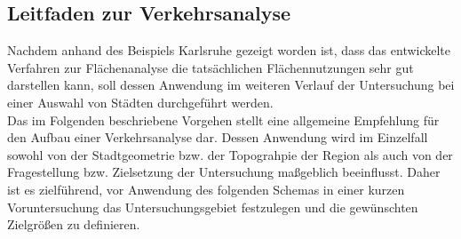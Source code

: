 \subsection{Leitfaden zur Verkehrsanalyse}
Nachdem anhand des Beispiels Karlsruhe gezeigt worden ist, dass das entwickelte Verfahren zur Flächenanalyse die tatsächlichen Flächennutzungen sehr gut darstellen kann, soll dessen Anwendung im weiteren Verlauf der Untersuchung bei einer Auswahl von Städten durchgeführt werden.\\

Das im Folgenden beschriebene Vorgehen stellt eine allgemeine Empfehlung für den Aufbau einer Verkehrsanalyse dar. Dessen Anwendung wird im Einzelfall sowohl von der Stadtgeometrie bzw. der Topograhpie der Region als auch von der Fragestellung bzw. Zielsetzung der Untersuchung maßgeblich beeinflusst. Daher ist es zielführend, vor Anwendung des folgenden Schemas in einer kurzen Voruntersuchung das Untersuchungsgebiet festzulegen und die gewünschten Zielgrößen zu definieren.

